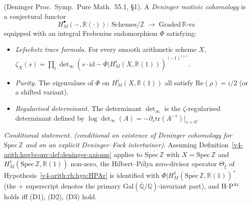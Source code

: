 \begin{definition}
\label{v4-arith:hpvbconv:def:deninger-axioms}
(Deninger Proc.~Symp.~Pure Math.~55.1, \S1).
A \emph{Deninger motivic cohomology} is a conjectural functor
\begin{equation}
H^{\bullet}_{M}(-,\mathbb{R}(\cdot)):\;\mathrm{Schemes}/\mathbb{Z}\;\longrightarrow\;\mathrm{Graded}\,\mathbb{R}\text{-vs}
\end{equation}
equipped with an integral Frobenius endomorphism \(\Phi\) satisfying:
\begin{itemize}
\item[(D1)] \emph{Lefschetz trace formula.} For every smooth
arithmetic scheme \(X\),
\(\zeta_{X}(s)=\prod_{i}\det_{\infty}(s\cdot\mathrm{id}-\Phi|H^{i}_{M}(X,\mathbb{R}(1)))^{(-1)^{i+1}}\).
\item[(D2)] \emph{Purity.} The eigenvalues of \(\Phi\) on
\(H^{i}_{M}(X,\mathbb{R}(1))\) all satisfy \(\mathrm{Re}(\rho)=i/2\) (or a
shifted variant).
\item[(D3)] \emph{Regularised determinant.} The determinant
\(\det_{\infty}\) is the \(\zeta\)-regularised determinant defined by
\(\log\det_{\infty}(A)=-\partial_{s}\mathrm{tr}(A^{-s})|_{s=0}\).
\end{itemize}
\end{definition}

\begin{proposition}
\label{v4-arith:hpvbconv:prop:deninger-equivalence}
\emph{Conditional statement.} \emph{(conditional on existence of Deninger cohomology
for \(\overline{\mathrm{Spec}\,\mathbb{Z}}\) and on an explicit
Deninger--Fock intertwiner)}. Assuming
Definition~\ref{v4-arith:hpvbconv:def:deninger-axioms} applies to
\(\overline{\mathrm{Spec}\,\mathbb{Z}}\) with \(X=\overline{\mathrm{Spec}\,\mathbb{Z}}\)
and \(H^{1}_{M}(\overline{\mathrm{Spec}\,\mathbb{Z}},\mathbb{R}(1))\)
non-zero, the Hilbert--P\'olya zero-divisor operator \(\Theta_{\xi}\) of
Hypothesis~\ref{v4-arith:rh:hyp:HPAr} is identified with
\(\Phi|H^{1}_{M}(\overline{\mathrm{Spec}\,\mathbb{Z}},\mathbb{R}(1))^{+}\)
(the \(+\) superscript denotes the primary
\(\mathrm{Gal}(\overline{\mathbb{Q}}/\mathbb{Q})\)-invariant part), and
H-P\(^{\mathrm{Ar}}\) holds iff (D1), (D2), (D3) hold.
\end{proposition}

